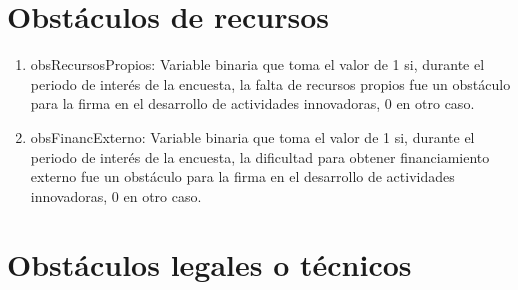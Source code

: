 \documentclass[12pt,a4paper]{article}
\begin{document}
\section{Obstáculos de recursos}

\begin{enumerate}
	\item obsRecursosPropios: Variable binaria que toma el valor de 1 si, durante el periodo de interés de la encuesta, la falta de recursos propios fue un obstáculo para la firma en el desarrollo de actividades innovadoras, 0 en otro caso.
	\item obsFinancExterno: Variable binaria que toma el valor de 1 si, durante el periodo de interés de la encuesta, la dificultad para obtener financiamiento externo fue un obstáculo para la firma en el desarrollo de actividades innovadoras, 0 en otro caso.
\end{enumerate}

\section{Obstáculos legales o técnicos}
\end{document}
